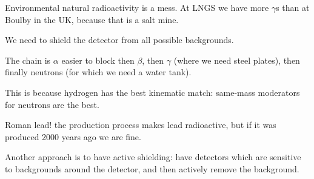 \documentclass[main.tex]{subfiles}
\begin{document}

Environmental natural radioactivity is a mess. 
At LNGS we have more \(\gamma \)s than at Boulby in the UK, because that is a salt mine. 


We need to shield the detector from all possible backgrounds. 

The chain is \(\alpha \) easier to block then \(\beta \), then \(\gamma \) (where we need steel plates), then finally neutrons (for which we need a water tank). 

This is because hydrogen has the best kinematic match: same-mass moderators for neutrons are the best. 

Roman lead! the production process makes lead radioactive, 
but if it was produced 2000 years ago we are fine. 

Another approach is to have active shielding: have detectors which are sensitive to backgrounds around the detector, and then actively remove the background. 
\end{document}
